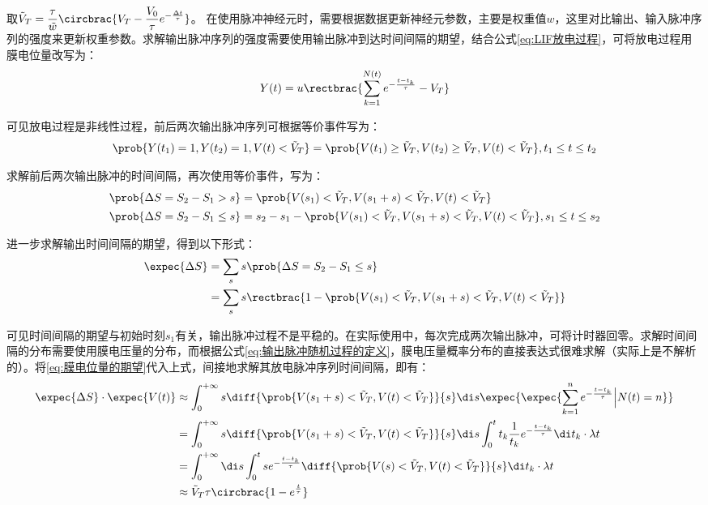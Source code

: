\documentclass[11pt]{article}
\begin{document}
取$\displaystyle \tilde{V}_T= \frac{\tau}{\tilde{w}}\circbrac{V_T-\frac{V_0}{\tau}e^{-\frac{\Delta t}{\tau}}}$。
在使用脉冲神经元时，需要根据数据更新神经元参数，主要是权重值$w$，这里对比输出、输入脉冲序列的强度来更新权重参数。求解输出脉冲序列的强度需要使用输出脉冲到达时间间隔的期望，结合公式\ref{eq:LIF放电过程}，可将放电过程用膜电位量改写为：
\begin{align}
  Y(t)=u\rectbrac{\sum_{k=1}^{N(t)}e^{-\frac{t-t_k}{\tau}}-V_T}
  \label{eq:输出脉冲随机过程的定义}
\end{align}\par
可见放电过程是非线性过程，前后两次输出脉冲序列可根据等价事件写为：
\begin{align*}
  \prob{Y(t_1)=1,Y(t_2)=1,V(t)<\tilde{V}_T}=\prob{V(t_1)\ge \tilde{V}_T,V(t_2)\ge \tilde{V}_T,V(t)<\tilde{V}_T},t_1\le t\le t_2
\end{align*}\par
求解前后两次输出脉冲的时间间隔，再次使用等价事件，写为：
\begin{align*}
  \prob{\Delta S=S_2-S_1>s}    & =\prob{V(s_1)< \tilde{V}_T , V(s_1+s)< \tilde{V}_T,V(t)<\tilde{V}_T}                         \\
  \prob{\Delta S=S_2-S_1\le s} & =s_2-s_1-\prob{V(s_1)< \tilde{V}_T , V(s_1+s)< \tilde{V}_T,V(t)<\tilde{V}_T},s_1\le t\le s_2
\end{align*}\par
进一步求解输出时间间隔的期望，得到以下形式：
\begin{align*}
  \expec{\Delta S} & =\sum_{s}s\prob{\Delta S=S_2-S_1\le s}                                                     \\
                   & =\sum_{s}s\rectbrac{1-\prob{V(s_1)< \tilde{V}_T , V(s_1+s)< \tilde{V}_T,V(t)<\tilde{V}_T}}
\end{align*}\par
可见时间间隔的期望与初始时刻$s_1$有关，输出脉冲过程不是平稳的。在实际使用中，每次完成两次输出脉冲，可将计时器回零。求解时间间隔的分布需要使用膜电压量的分布，而根据公式\ref{eq:输出脉冲随机过程的定义}，膜电压量概率分布的直接表达式很难求解（实际上是不解析的）。将\ref{eq:膜电位量的期望}代入上式，间接地求解其放电脉冲序列时间间隔，即有：
\begin{align*}
  \expec{\Delta S}\cdot\expec{V(t)} & \approx\int_{0}^{+\infty}s\diff{\prob{V(s_1+s)< \tilde{V}_T,V(t)<\tilde{V}_T}}{s}\di s\expec{\expec{\sum_{k=1}^{n}e^{-\frac{t-t_k}{\tau}}\Big|N(t)=n}}    \\
                                    & =\int_{0}^{+\infty}s\diff{\prob{V(s_1+s)< \tilde{V}_T,V(t)<\tilde{V}_T}}{s}\di s\int_{0}^{t}t_k\frac{1}{t_k}e^{-\frac{t-t_k}{\tau}}\di t_k\cdot \lambda t \\
                                    & =\int_{0}^{+\infty}\di s\int_{0}^{t} se^{-\frac{t-t_k}{\tau}}\diff{\prob{V(s)< \tilde{V}_T,V(t)<\tilde{V}_T}}{s}\di t_k\cdot \lambda t                    \\
                                    & \approx \tilde{V}_T\tau\circbrac{1-e^\frac{t}{\tau}}
\end{align*}\par
\end{document}
